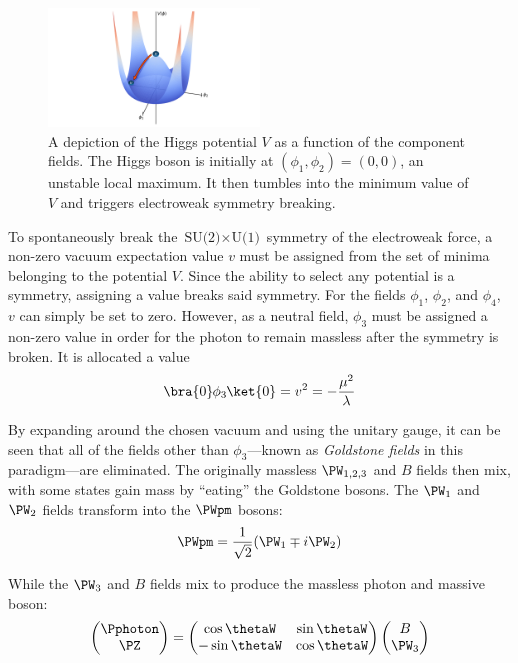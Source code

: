 \begin{figure}[htbp]
    \centering
    \includegraphics[width=0.5\textwidth]{./figures/higgs_potential_pptx.pdf}  %
    \caption[A depiction of the Higgs potential $V$ as a function of the component fields]{A depiction of the Higgs potential $V$ as a function of the component fields. The Higgs boson is initially at $(\phi_1, \phi_2) = (\text{0}, \text{0})$, an unstable local maximum. It then tumbles into the minimum value of $V$ and triggers electroweak symmetry breaking.}
    \label{fig:higgs_potential}
\end{figure}

To spontaneously break the $\text{SU(2)} \times \text{U(1)}$ symmetry of the electroweak force, a non-zero vacuum expectation value $v$ must be assigned from the set of minima belonging to the potential $V$. Since the ability to select any potential is a symmetry, assigning a value breaks said symmetry. For the fields $\phi_1$, $\phi_2$, and $\phi_4$, $v$ can simply be set to zero. However, as a neutral field, $\phi_3$ must be assigned a non-zero value in order for the photon to remain massless after the symmetry is broken. It is allocated a value
\begin{equation}
    \bra{0} \mkern-1mu \phi_3 \mkern-1mu \ket{0} = v^2 = -\frac{\mu^2}{\lambda}
    \label{eq:higgs_vev}
\end{equation}

By expanding \HiggsField around the chosen vacuum and using the unitary gauge, it can be seen that all of the fields other than $\phi_3$---known as \emph{Goldstone fields} in this paradigm---are eliminated. The originally massless $\PW_{1,2,3}$ and $B$ fields then mix, with some states gain mass by ``eating'' the Goldstone bosons. The $\PW_1$ and $\PW_2$ fields transform into the $\PWpm$ bosons:
\begin{equation}
    \PWpm = \frac{1}{\sqrt{2}} (\PW_1 \mp i\PW_2)
    \label{eq:EWSB_W}
\end{equation}

While the $\PW_3$ and $B$ fields mix to produce the massless photon and massive \PZ boson:
\begin{equation}
    \begin{pmatrix} \Pphoton \\ \PZ \end{pmatrix} = \begin{pmatrix} \cos\thetaW & \sin\thetaW \\ -\sin\thetaW & \cos\thetaW \end{pmatrix} \begin{pmatrix} B \\ \PW_3 \end{pmatrix}
    \label{eq:EWSB_photon_Z}
\end{equation}


